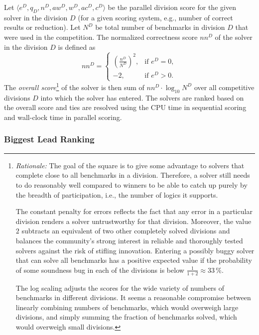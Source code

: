 \documentclass[12pt]{article}
\begin{document}
Let $\langle e^D, q_D, n^D, \mathit{aw}^D, w^D, \mathit{ac}^D, c^D \rangle$ be the
parallel division score for the given solver in the division $D$ (for a given
scoring system, e.g., number of correct results or reduction). Let $N^D$ be total
number of benchmarks in division $D$ that were used in the competition. The
normalized correctness score $\mathit{nn}^D$ of the solver in the division $D$
is defined as
\[
  \mathit{nn}^D =
  \begin{cases}
    \left( \frac{n^D}{N^D} \right) ^2, &\text{if }e^D = 0, \\
    -2, &\text{if }e^D > 0.
  \end{cases}
\]
The \emph{overall score}\footnote{\emph{Rationale:} %
  The goal of the square is to give some advantage to solvers
  that complete close to all benchmarks in a division. Therefore, a
  solver still needs to do reasonably well compared to winners to be
  able to catch up purely by the breadth of participation, i.e., the
  number of logics it supports.

  The constant penalty for errors reflects the fact that any error in a
  particular division renders a solver untrustworthy for that division.
  Moreover, the value~$2$ subtracts an equivalent of two other completely solved
  divisions and balances the community's strong interest in reliable and
  thoroughly tested solvers against the risk of stifling innovation. Entering a
  possibly buggy solver that can solve all benchmarks has a positive expected
  value if the probability of some soundness bug in each of the divisions is
  below $\frac{1}{1+2} \approx 33$\,\%.

  The log scaling adjusts the scores for the wide variety of numbers of
  benchmarks in different divisions. It seems a reasonable compromise between
  linearly combining numbers of benchmarks, which would overweigh large
  divisions, and simply summing the fraction of benchmarks solved, which would
  overweigh small divisions.} of the solver is then sum of
$\mathit{nn}^D \cdot \log_{10} N^D$ over all competitive divisions $D$ into
which the solver has entered. The solvers are ranked based on the overall score
and ties are resolved using the CPU time in sequential scoring and wall-clock
time in parallel scoring.

\subsubsection{Biggest Lead Ranking}
\end{document}
